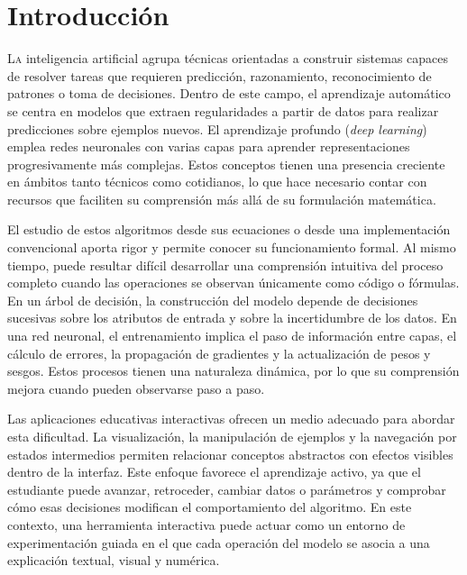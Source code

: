\chapter{Introducción}
\label{chap:introducion}

\lettrine{L}{a} inteligencia artificial agrupa técnicas orientadas a construir sistemas capaces de resolver tareas que requieren predicción, razonamiento, reconocimiento de patrones o toma de decisiones. Dentro de este campo, el aprendizaje automático se centra en modelos que extraen regularidades a partir de datos para realizar predicciones sobre ejemplos nuevos.
El aprendizaje profundo (\textit{deep learning}) emplea redes neuronales con varias capas para aprender representaciones progresivamente más complejas. Estos conceptos tienen una presencia creciente en ámbitos tanto técnicos como cotidianos, lo que hace necesario contar con recursos que faciliten su comprensión más allá de su formulación matemática.

El estudio de estos algoritmos desde sus ecuaciones o desde una implementación convencional aporta rigor y permite conocer su funcionamiento formal. Al mismo tiempo, puede resultar difícil desarrollar una comprensión intuitiva del proceso completo cuando las operaciones se observan únicamente como código o fórmulas. En un árbol de decisión, la construcción del modelo depende de decisiones sucesivas sobre los atributos de entrada y sobre la incertidumbre de los datos. En una red neuronal, el entrenamiento implica el paso de información entre capas, el cálculo de errores, la propagación de gradientes y la actualización de pesos y sesgos. Estos procesos tienen una naturaleza dinámica, por lo que su comprensión mejora cuando pueden observarse paso a paso.

Las aplicaciones educativas interactivas ofrecen un medio adecuado para abordar esta dificultad. La visualización, la manipulación de ejemplos y la navegación por estados intermedios permiten relacionar conceptos abstractos con efectos visibles dentro de la interfaz. Este enfoque favorece el aprendizaje activo, ya que el estudiante puede avanzar, retroceder, cambiar datos o parámetros y comprobar cómo esas decisiones modifican el comportamiento del algoritmo. En este contexto, una herramienta interactiva puede actuar como un entorno de experimentación guiada en el que cada operación del modelo se asocia a una explicación textual, visual y numérica.

